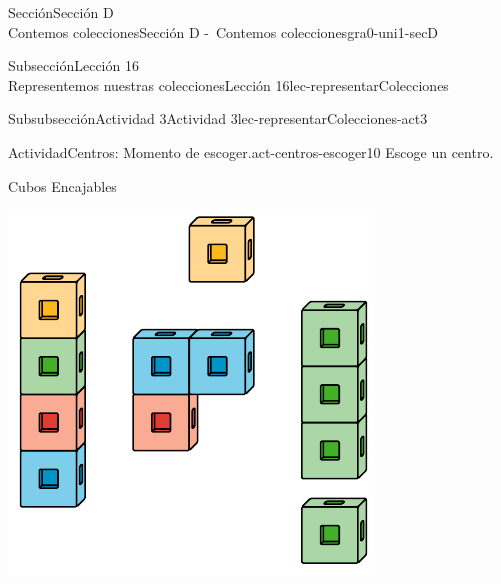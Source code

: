 \begin{sectionptx}{Sección}{{\Large Sección D\\}Contemos colecciones}{}{Sección D -~Contemos colecciones}{}{}{gra0-uni1-secD}
\begin{subsectionptx}{Subsección}{{\normalsize Lección 16\\[-0.05cm]}Representemos nuestras colecciones}{}{Lección 16}{}{}{lec-representarColecciones}
%
%
\typeout{************************************************}
\typeout{************************************************}
%
%
%
\typeout{************************************************}
\typeout{************************************************}
%
\begin{subsubsectionptx}{Subsubsección}{Actividad 3}{}{Actividad 3}{}{}{lec-representarColecciones-act3}
\begin{activity}{Actividad}{Centros: Momento de escoger.}{act-centros-escoger10}%
Escoge un centro.%
\begin{sidebyside}{2}{0.025}{0.025}{0.05}%
\begin{sbspanel}{0.45}%
Cubos Encajables%
\par
\includegraphics[max width=\linewidth, center]{external/svg-source/tikz-file-128850.pdf}

\end{sbspanel}
\end{sidebyside}
\end{activity}
\end{subsubsectionptx}
\end{subsectionptx}
\end{sectionptx}

